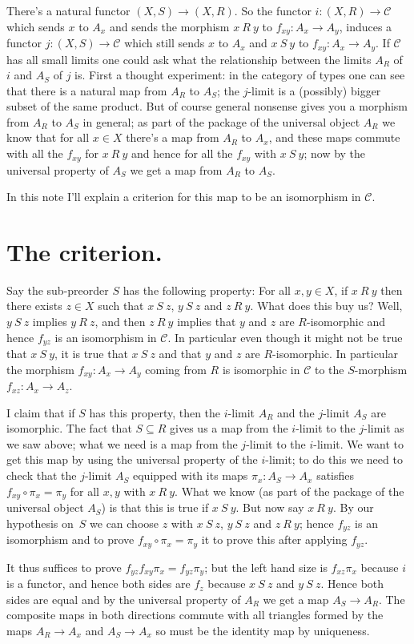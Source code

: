 \documentclass{amsart}
\theoremstyle{plain}
\theoremstyle{remark}
\begin{document}
There's a natural functor $(X,S)\to(X,R)$. So the functor $i:(X,R)\to\mathcal{C}$ which sends $x$ to $A_x$ and sends the morphism $x\ R\ y$ to $f_{xy}:A_x\to A_y$, induces a functor $j:(X,S)\to\mathcal{C}$ which still sends $x$ to $A_x$ and $x\ S\ y$ to $f_{xy}:A_x\to A_y$. If $\mathcal{C}$ has all small limits one could ask what the relationship between the limits $A_R$ of $i$ and $A_S$ of $j$ is. First a thought experiment: in the category of types one can see that there is a natural map from $A_R$ to $A_S$; the $j$-limit is a (possibly) bigger subset of the same product. But of course general nonsense gives you a morphism from $A_R$ to $A_S$ in general; as part of the package of the universal object $A_R$ we know that for all $x\in X$ there's a map from $A_R$ to $A_x$, and these maps commute with all the $f_{xy}$ for $x\ R\ y$ and hence for all the $f_{xy}$ with $x\ S\ y$; now by the universal property of $A_S$ we get a map from $A_R$ to $A_S$.

In this note I'll explain a criterion for this map to be an isomorphism in $\mathcal{C}$.

\section{The criterion.}

Say the sub-preorder $S$ has the following property: For all $x,y\in X$, if $x\ R\ y$ then there exists $z\in X$ such that $x\ S\ z$, $y\ S\ z$ and $z\ R\ y$. What does this buy us? Well, $y\ S\ z$ implies $y\ R\ z$, and then $z\ R\ y$ implies that $y$ and $z$ are $R$-isomorphic and hence $f_{yz}$ is an isomorphism in $\mathcal{C}$. In particular even though it might not be true that $x\ S\ y$, it is true that $x\ S\ z$ and that $y$ and $z$ are $R$-isomorphic. In particular the morphism $f_{xy}:A_x\to A_y$ coming from $R$ is isomorphic in $\mathcal{C}$ to the $S$-morphism $f_{xz}:A_x\to A_z$.

I claim that if $S$ has this property, then the $i$-limit $A_R$ and the $j$-limit $A_S$ are isomorphic. The fact that $S\subseteq R$ gives us a map from the $i$-limit to the $j$-limit as we saw above; what we need is a map from the $j$-limit to the $i$-limit. We want to get this map by using the universal property of the $i$-limit; to do this we need to check that the $j$-limit $A_S$ equipped with its maps $\pi_x:A_S\to A_x$ satisfies $f_{xy}\circ\pi_x=\pi_y$ for all $x,y$ with $x\ R\ y$. What we know (as part of the package of the universal object $A_S$) is that this is true if $x\ S\ y$. But now say $x\ R\ y$. By our hypothesis on~$S$ we can choose $z$ with $x\ S\ z$, $y\ S\ z$ and $z\ R\ y$; hence $f_{yz}$ is an isomorphism and to prove $f_{xy}\circ\pi_x=\pi_y$ it to prove this after applying $f_{yz}$.

It thus suffices to prove $f_{yz}f_{xy}\pi_x=f_{yz}\pi_y$; but the left hand size is $f_{xz}\pi_x$ because $i$ is a functor, and hence both sides are $f_z$ because $x\ S\ z$ and $y\ S\ z$. Hence both sides are equal and by the universal property of $A_R$ we get a map $A_S\to A_R$. The composite maps in both directions commute with all triangles formed by the maps $A_R\to A_x$ and $A_S\to A_x$ so must be the identity map by uniqueness.
\end{document}
